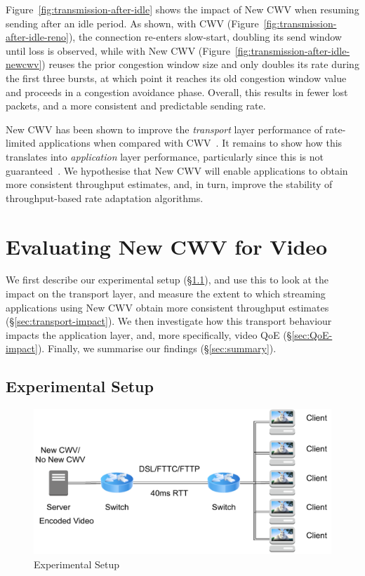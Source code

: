 \documentclass[10pt,sigconf,anonymous]{acmart}
\begin{document}
Figure~\ref{fig:transmission-after-idle} shows the impact of New CWV when resuming sending after an idle period. As shown, with CWV (Figure~\ref{fig:transmission-after-idle-reno}), the connection re-enters slow-start, doubling its send window until loss is observed, while with New CWV (Figure~\ref{fig:transmission-after-idle-newcwv}) reuses the prior congestion window size and only doubles its rate during the first three bursts, at which point it reaches its old congestion window value and proceeds in a congestion avoidance phase. Overall, this results in fewer lost packets, and a more consistent and predictable sending rate.

New CWV has been shown to improve the \emph{transport} layer performance of rate-limited applications when compared with CWV~\cite{Nazir-2014-performance-evaluation-congestion-window-validation-dash-newcwv}. It remains to show how this translates into \emph{application} layer performance, particularly since this is not guaranteed~\cite{Spiteri-2016-BOLA}. We hypothesise that New CWV will enable applications to obtain more consistent throughput estimates, and, in turn, improve the stability of throughput-based rate adaptation algorithms.

\section{Evaluating New CWV for Video}
\label{sec:evaluation}

We first describe our experimental setup (\S\ref{sec:experimental-setup}), and use this to look at the impact on the transport layer, and measure the extent to which streaming applications using New CWV obtain more consistent throughput estimates (\S\ref{sec:transport-impact}). We then investigate how this transport behaviour impacts the application layer, and, more specifically, video QoE (\S\ref{sec:QoE-impact}). Finally,  we summarise our findings (\S\ref{sec:summary}).

\subsection{Experimental Setup}
\label{sec:experimental-setup}

\begin{figure}
  \centering
  \includegraphics[width=.5\textwidth]{figures/setup.pdf}
  \caption{Experimental Setup}
  \label{fig:experimental-setup}
\end{figure}
\end{document}
